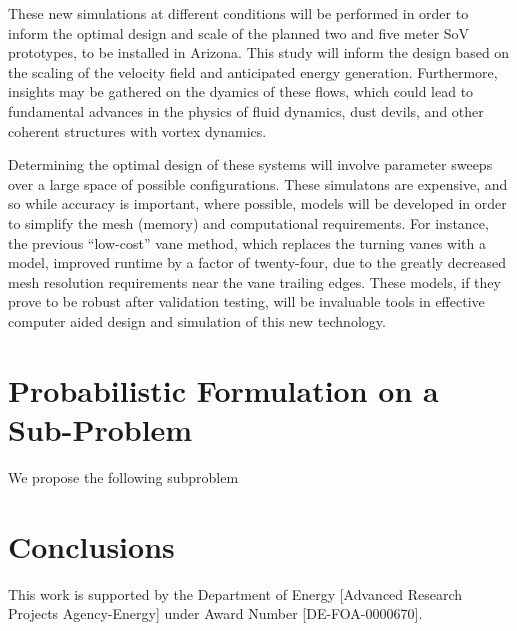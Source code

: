 \documentclass{article}
\begin{document}
These new simulations at different conditions will be performed in order
to inform the optimal design and scale of the planned two and five meter
SoV prototypes, to be installed in Arizona. This study will inform the
design based on the scaling of the velocity field and anticipated energy
generation. Furthermore, insights may be gathered on the dyamics of
these flows, which could lead to fundamental advances in the physics of
fluid dynamics, dust devils, and other coherent structures with vortex 
dynamics\cite{Mullen1977181,smithleslie,kanak}. 

Determining the optimal design of these systems will involve parameter
sweeps over a large space of possible configurations. These simulatons
are expensive, and so while accuracy is important, where possible,
models will be developed in order to simplify the mesh (memory) and
computational requirements. For instance, the previous ``low-cost'' vane
 method, which replaces the turning
vanes with a model, improved runtime by a factor of twenty-four, due to
the greatly decreased mesh resolution requirements near the vane
trailing edges. These models, if they prove to be robust after
validation testing, will be
invaluable tools in effective computer aided design and simulation of
this new technology.  


%
%
%
%
\section{Probabilistic Formulation on a Sub-Problem}


We propose the following subproblem

%
%
%
\section{Conclusions}



%
%
This work is supported by the Department of Energy [Advanced Research
Projects Agency-Energy] under Award Number [DE-FOA-0000670].    



\end{document}
